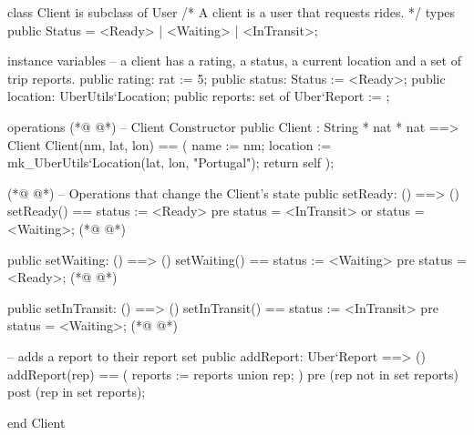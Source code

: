 \begin{vdmpp}[breaklines=true]
class Client is subclass of User
/*
    A client is a user that requests rides.
*/
types
    public Status = <Ready> | <Waiting> | <InTransit>;
    
instance variables
    -- a client has a rating, a status, a current location and a set of trip reports.
    public rating: rat := 5;
    public status: Status := <Ready>;
    public location: UberUtils`Location;
    public reports: set of Uber`Report := {};

operations
(*@
\label{Client:16}
@*)
  -- Client Constructor
    public Client : String * nat * nat ==> Client
        Client(nm, lat, lon) == (
            name := nm;
            location := mk_UberUtils`Location(lat, lon, "Portugal");
            return self
        );

(*@
\label{setReady:24}
@*)
    -- Operations that change the Client's state
    public setReady: () ==> ()
        setReady() ==
        status := <Ready>
        pre status = <InTransit> or status = <Waiting>;
(*@
\label{setWaiting:29}
@*)
        
    public setWaiting: () ==> ()
        setWaiting() ==
            status := <Waiting>
            pre status = <Ready>;
(*@
\label{setInTransit:34}
@*)
    
    public setInTransit: () ==> ()
        setInTransit() ==
            status := <InTransit>
            pre status = <Waiting>;
(*@
\label{addReport:39}
@*)
    
    -- adds a report to their report set
    public addReport: Uber`Report ==> ()
        addReport(rep) == (
            reports := reports union {rep};
        )    
        pre (rep not in set reports)
        post (rep in set reports);
            
end Client
\end{vdmpp}
